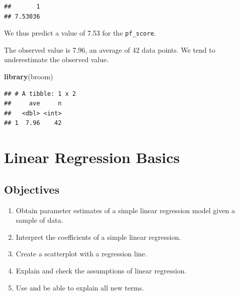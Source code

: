 \documentclass[
]{book}
\newenvironment{Shaded}{\begin{snugshade}}{\end{snugshade}}
\newcommand{\DataTypeTok}[1]{\textcolor[rgb]{0.13,0.29,0.53}{#1}}
\newcommand{\DecValTok}[1]{\textcolor[rgb]{0.00,0.00,0.81}{#1}}
\newcommand{\KeywordTok}[1]{\textcolor[rgb]{0.13,0.29,0.53}{\textbf{#1}}}
\newcommand{\NormalTok}[1]{#1}
\newcommand{\OperatorTok}[1]{\textcolor[rgb]{0.81,0.36,0.00}{\textbf{#1}}}
\newcommand{\StringTok}[1]{\textcolor[rgb]{0.31,0.60,0.02}{#1}}
\providecommand{\tightlist}{%
  \setlength{\itemsep}{0pt}\setlength{\parskip}{0pt}}
\begin{document}
\begin{verbatim}
##       1 
## 7.53036
\end{verbatim}

We thus predict a value of 7.53 for the \texttt{pf\_score}.

The observed value is 7.96, an average of 42 data points. We tend to underestimate the observed value.

\begin{Shaded}
\begin{Highlighting}[]
\KeywordTok{library}\NormalTok{(broom)}
\end{Highlighting}
\end{Shaded}

\begin{Shaded}
\end{Shaded}

\begin{verbatim}
## # A tibble: 1 x 2
##     ave     n
##   <dbl> <int>
## 1  7.96    42
\end{verbatim}

\hypertarget{LRBASICS}{%
\chapter{Linear Regression Basics}\label{LRBASICS}}

\hypertarget{objectives-24}{%
\section{Objectives}\label{objectives-24}}

\begin{enumerate}
\def\labelenumi{\arabic{enumi})}
\tightlist
\item
  Obtain parameter estimates of a simple linear regression model given a sample of data.\\
\item
  Interpret the coefficients of a simple linear regression.\\
\item
  Create a scatterplot with a regression line.\\
\item
  Explain and check the assumptions of linear regression.\\
\item
  Use and be able to explain all new terms.
\end{enumerate}
\end{document}
